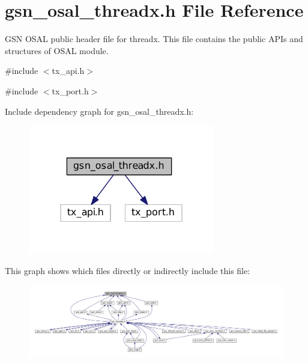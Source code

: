 \hypertarget{a00536}{
\section{gsn\_\-osal\_\-threadx.h File Reference}
\label{a00536}
}


GSN OSAL public header file for threadx. This file contains the public APIs and structures of OSAL module.  


{\ttfamily \#include $<$tx\_\-api.h$>$}\par
{\ttfamily \#include $<$tx\_\-port.h$>$}\par
Include dependency graph for gsn\_\-osal\_\-threadx.h:
\nopagebreak
\begin{figure}[H]
\begin{center}
\leavevmode
\includegraphics[width=231pt]{a00773}
\end{center}
\end{figure}
This graph shows which files directly or indirectly include this file:
\nopagebreak
\begin{figure}[H]
\begin{center}
\leavevmode
\includegraphics[width=400pt]{a00774}
\end{center}
\end{figure}
